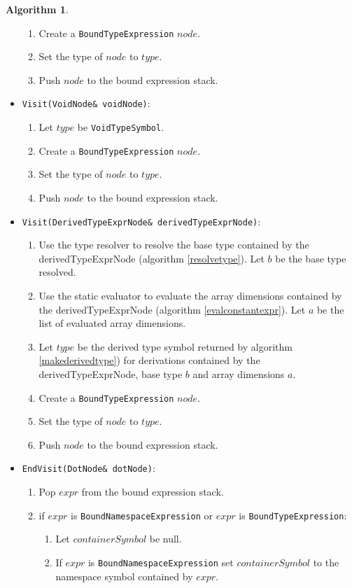 \documentclass[a4paper,oneside,11pt]{book}
\theoremstyle{definition}
\newtheorem{algo}{Algorithm}[section]
\begin{document}
\begin{algo}
\begin{itemize}
\begin{enumerate}
\item
Create a \verb|BoundTypeExpression| $node$.
\item
Set the type of $node$ to $type$.
\item
Push $node$ to the bound expression stack.
\end{enumerate}
\item
\verb|Visit(VoidNode& voidNode)|:
\begin{enumerate}
\item
Let $type$ be \verb|VoidTypeSymbol|.
\item
Create a \verb|BoundTypeExpression| $node$.
\item
Set the type of $node$ to $type$.
\item
Push $node$ to the bound expression stack.
\end{enumerate}
\item
\verb|Visit(DerivedTypeExprNode& derivedTypeExprNode)|:
\begin{enumerate}
\item
Use the type resolver to resolve the base type contained by the derivedTypeExprNode (algorithm \ref{resolvetype}). Let $b$ be the base type resolved.
\item
Use the static evaluator to evaluate the array dimensions contained by the derivedTypeExprNode (algorithm \ref{evalconstantexpr}).
Let $a$ be the list of evaluated array dimensions.
\item
Let $type$ be the derived type symbol returned by algorithm \ref{makederivedtype}) for derivations contained by the derivedTypeExprNode, base type $b$ and
array dimensions $a$.
\item
Create a \verb|BoundTypeExpression| $node$.
\item
Set the type of $node$ to $type$.
\item
Push $node$ to the bound expression stack.
\end{enumerate}
\item
\verb|EndVisit(DotNode& dotNode)|:\\
\begin{enumerate}
\item
Pop $expr$ from the bound expression stack.
\item
if $expr$ is \verb|BoundNamespaceExpression| or $expr$ is \verb|BoundTypeExpression|:
\begin{enumerate}
\item
Let $containerSymbol$ be null.
\item
If $expr$ is \verb|BoundNamespaceExpression| set $containerSymbol$ to the namespace symbol contained by $expr$.

\end{enumerate}
\end{enumerate}
\end{itemize}
\end{algo}
\end{document}
